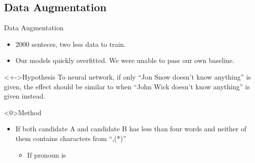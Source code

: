\message{ !name(presentation.tex)}\documentclass[10pt]{beamer}
\begin{document}
\subsection{Data Augmentation}
\begin{frame}{Data Augmentation}
  \begin{itemize}
  \item<+-> 2000 senteces, two less data to train.
  \item<+-> Our models quickly overfitted. We were unable to pass our own baseline.
  \end{itemize}
  \begin{block}<+->{Hypothesis}
    To neural network, if only ``Jon Snow doesn't know anything'' is given, the effect should be similar to when ``John Wick doesn't know anything'' is given instead.
  \end{block}
  


\end{frame}

\begin{frame}<0>{Method}
  \begin{itemize}
  \item If both candidate A and candidate B has less than four words and neither of them contains characters from ``,(*)''
    \begin{itemize}
    \item If pronoun is 
    \end{itemize}
  \end{itemize}
\end{frame}
\end{document}
